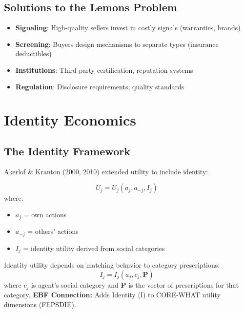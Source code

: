 \subsection{Solutions to the Lemons Problem}

\begin{itemize}
    \item \textbf{Signaling}: High-quality sellers invest in costly signals (warranties, brands)
    \item \textbf{Screening}: Buyers design mechanisms to separate types (insurance deductibles)
    \item \textbf{Institutions}: Third-party certification, reputation systems
    \item \textbf{Regulation}: Disclosure requirements, quality standards
\end{itemize}

\section{Identity Economics}

\subsection{The Identity Framework}

Akerlof \& Kranton (2000, 2010) extended utility to include identity:

\begin{definition}
\begin{equation}
U_j = U_j(a_j, a_{-j}, I_j)
\end{equation}
where:
\begin{itemize}
    \item $a_j$ = own actions
    \item $a_{-j}$ = others' actions
    \item $I_j$ = identity utility derived from social categories
\end{itemize}
\end{definition}

\begin{axiom}
\label{ax:ga2}
Identity utility depends on matching behavior to category prescriptions:
\begin{equation}
I_j = I_j(a_j, c_j, \mathbf{P})
\end{equation}
where $c_j$ is agent's social category and $\mathbf{P}$ is the vector of prescriptions for that category.
\textbf{EBF Connection:} Adds Identity (I) to CORE-WHAT utility dimensions (FEPSDIE).
\end{axiom}

